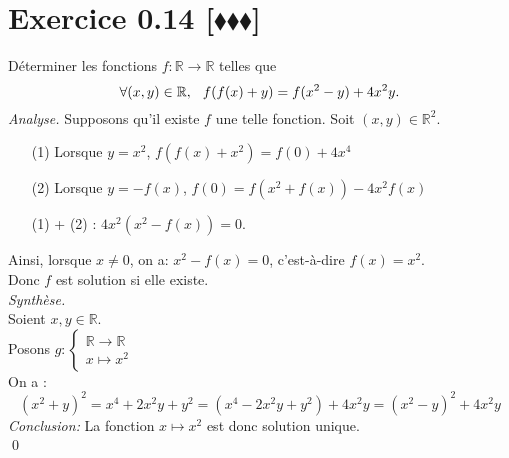 \documentclass[10pt]{article}
\begin{document}
\section*{Exercice 0.14 [$\blacklozenge\blacklozenge\blacklozenge$]}
\begin{tcolorbox}[enhanced, width=7in, center, size=fbox, fontupper=\large, drop shadow southwest]
    Déterminer les fonctions $f: \mathbb{R} \rightarrow \mathbb{R}$ telles que 
    \begin{equation*}
        \forall{(x,y)\in\mathbb{R}}, \hspace{0.25cm} f(f(x)+y) = f(x^2-y)+4x^2y.
    \end{equation*}
    \emph{Analyse.}
    Supposons qu'il existe $f$ une telle fonction. Soit $(x,y)\in\mathbb{R}^2$. 
    \begin{itemize}
        \item[(1)] Lorsque $y=x^2$, $f(f(x)+x^2)=f(0)+4x^4$
        \item[(2)] Lorsque $y=-f(x)$, $f(0)=f(x^2+f(x))-4x^2f(x)$ 
        \item[(1)] + (2) : $4x^2(x^2 - f(x)) = 0$.
    \end{itemize}
    Ainsi, lorsque $x\neq0$, on a: $x^2-f(x) = 0$, c'est-à-dire $f(x)=x^2$.\\
    Donc $f$ est solution si elle existe.\\[0.2cm]
    \emph{Synthèse.}\\
    Soient $x,y\in\mathbb{R}$.\\
    Posons $g:\begin{cases}\mathbb{R}\rightarrow\mathbb{R}\\x\mapsto x^2\end{cases}$\\
    On a :
    \begin{equation*}
        (x^2+y)^2 = x^4 + 2x^2y + y^2 = (x^4-2x^2y+y^2)+4x^2y=(x^2-y)^2+4x^2y
    \end{equation*}
    \emph{Conclusion:}
    La fonction $x\mapsto x^2$ est donc solution unique.\\
    \qed
\end{tcolorbox}
\end{document}
